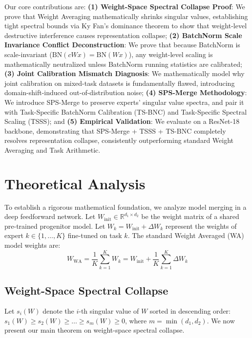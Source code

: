 \documentclass{article}
\theoremstyle{plain}
\theoremstyle{definition}
\theoremstyle{remark}
\begin{document}
Our core contributions are: \textbf{(1) Weight-Space Spectral Collapse Proof}: We prove that Weight Averaging mathematically shrinks singular values, establishing tight spectral bounds via Ky Fan's dominance theorem to show that weight-level destructive interference causes representation collapse; \textbf{(2) BatchNorm Scale Invariance Conflict Deconstruction}: We prove that because BatchNorm is scale-invariant ($\text{BN}(cWx) = \text{BN}(Wx)$), any weight-level scaling is mathematically neutralized unless BatchNorm running statistics are calibrated; \textbf{(3) Joint Calibration Mismatch Diagnosis}: We mathematically model why joint calibration on mixed-task datasets is fundamentally flawed, introducing domain-shift-induced out-of-distribution noise; \textbf{(4) SPS-Merge Methodology}: We introduce SPS-Merge to preserve experts' singular value spectra, and pair it with Task-Specific BatchNorm Calibration (TS-BNC) and Task-Specific Spectral Scaling (TSSS); and \textbf{(5) Empirical Validation}: We evaluate on a ResNet-18 backbone, demonstrating that SPS-Merge + TSSS + TS-BNC completely resolves representation collapse, consistently outperforming standard Weight Averaging and Task Arithmetic.

\section{Theoretical Analysis}
To establish a rigorous mathematical foundation, we analyze model merging in a deep feedforward network. Let $W_{\text{init}} \in \mathbb{R}^{d_1 \times d_2}$ be the weight matrix of a shared pre-trained progenitor model. Let $W_k = W_{\text{init}} + \Delta W_k$ represent the weights of expert $k \in \{1, \dots, K\}$ fine-tuned on task $k$. The standard Weight Averaged (WA) model weights are:
\begin{equation}
    W_{\text{WA}} = \frac{1}{K} \sum_{k=1}^K W_k = W_{\text{init}} + \frac{1}{K} \sum_{k=1}^K \Delta W_k
\end{equation}

\subsection{Weight-Space Spectral Collapse}
Let $s_i(W)$ denote the $i$-th singular value of $W$ sorted in descending order: $s_1(W) \ge s_2(W) \ge \dots \ge s_m(W) \ge 0$, where $m = \min(d_1, d_2)$.
We now present our main theorem on weight-space spectral collapse.
\end{document}
